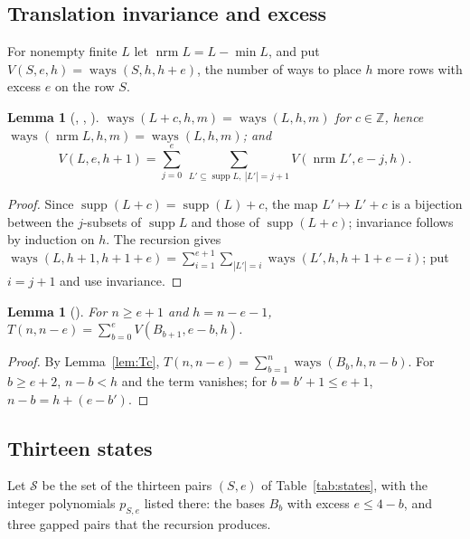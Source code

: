 \documentclass[11pt]{amsart}
\theoremstyle{plain}
\newtheorem{lemma}[theorem]{Lemma}
\theoremstyle{definition}
\newcommand{\Z}{\mathbb{Z}}
\newcommand{\supp}{\operatorname{supp}}
\newcommand{\ways}{\operatorname{ways}}
\newcommand{\nrm}{\operatorname{nrm}}
\newcommand{\St}{\mathcal{S}}
\begin{document}
\subsection{Translation invariance and excess}
For nonempty finite $L$ let $\nrm L=L-\min L$, and put $V(S,e,h)=\ways(S,h,h+e)$, the number of ways to place $h$ more rows with excess $e$ on the row $S$.

\begin{lemma}[, , ]\label{lem:step}
$\ways(L+c,h,m)=\ways(L,h,m)$ for $c\in\Z$, hence $\ways(\nrm L,h,m)=\ways(L,h,m)$; and
\[
V(L,e,h+1)=\sum_{j=0}^{e}\ \sum_{L'\subseteq\supp L,\ |L'|=j+1}V(\nrm L',e-j,h).
\]
\end{lemma}
\begin{proof}
Since $\supp(L+c)=\supp(L)+c$, the map $L'\mapsto L'+c$ is a bijection between the $j$-subsets of $\supp L$ and those of $\supp(L+c)$; invariance follows by induction on $h$. The recursion gives $\ways(L,h+1,h+1+e)=\sum_{i=1}^{e+1}\sum_{|L'|=i}\ways(L',h,h+1+e-i)$; put $i=j+1$ and use invariance.
\end{proof}

\begin{lemma}[]\label{lem:diagsum}
For $n\ge e+1$ and $h=n-e-1$, $T(n,n-e)=\sum_{b=0}^{e}V(B_{b+1},e-b,h)$.
\end{lemma}
\begin{proof}
By Lemma~\ref{lem:Tc}, $T(n,n-e)=\sum_{b=1}^{n}\ways(B_b,h,n-b)$. For $b\ge e+2$, $n-b<h$ and the term vanishes; for $b=b'+1\le e+1$, $n-b=h+(e-b')$.
\end{proof}

\subsection{Thirteen states}
Let $\St$ be the set of the thirteen pairs $(S,e)$ of Table~\ref{tab:states}, with the integer polynomials $p_{S,e}$ listed there: the bases $B_b$ with excess $e\le4-b$, and three gapped pairs that the recursion produces.
\end{document}
